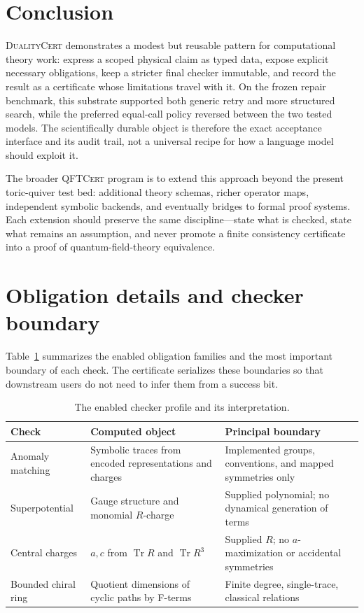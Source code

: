 \documentclass[11pt]{scrartcl}
\newcommand{\toolname}{\textsc{DualityCert}}
\begin{document}
\section{Conclusion}

\toolname{} demonstrates a modest but reusable pattern for computational
theory work: express a scoped physical claim as typed data, expose explicit
necessary obligations, keep a stricter final checker immutable, and record the
result as a certificate whose limitations travel with it.  On the frozen repair
benchmark, this substrate supported both generic retry and more structured
search, while the preferred equal-call policy reversed between the two tested
models.  The scientifically durable object is therefore the exact acceptance
interface and its audit trail, not a universal recipe for how a language model
should exploit it.

The broader \textsc{QFTCert} program is to extend this approach beyond the
present toric-quiver test bed: additional theory schemas, richer operator maps,
independent symbolic backends, and eventually bridges to formal proof systems.
Each extension should preserve the same discipline---state what is checked,
state what remains an assumption, and never promote a finite consistency
certificate into a proof of quantum-field-theory equivalence.

\appendix

\section{Obligation details and checker boundary}
\label{app:checker}

Table~\ref{tab:obligation-boundary} summarizes the enabled obligation families
and the most important boundary of each check.  The certificate serializes these
boundaries so that downstream users do not need to infer them from a success
bit.

\begin{table}[ht]
\centering
\begin{tabular}{p{}p{}p{}}
\toprule
Check & Computed object & Principal boundary \\
\midrule
Anomaly matching & Symbolic traces from encoded representations and charges
  & Implemented groups, conventions, and mapped symmetries only \\
Superpotential & Gauge structure and monomial $R$-charge
  & Supplied polynomial; no dynamical generation of terms \\
Central charges & $a,c$ from $\operatorname{Tr}R$ and $\operatorname{Tr}R^3$
  & Supplied $R$; no $a$-maximization or accidental symmetries \\
Bounded chiral ring & Quotient dimensions of cyclic paths by F-terms
  & Finite degree, single-trace, classical relations \\
\bottomrule
\end{tabular}
\caption{The enabled checker profile and its interpretation.}
\label{tab:obligation-boundary}
\end{table}
\end{document}
